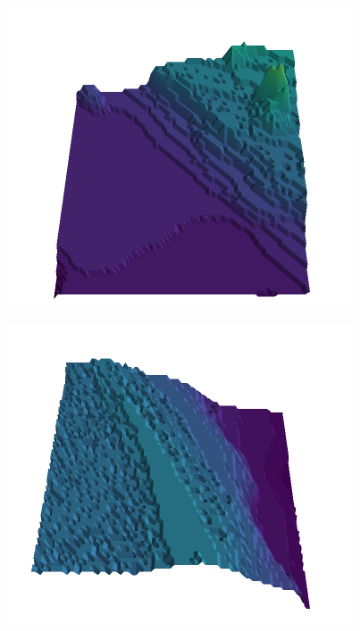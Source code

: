 \begin{figure}[H]
    \begin{subfigure}[b]{0.19\textwidth}
        \includegraphics[width=\linewidth]{../img/5/quarry/false_negative//patch-3d-majavi-colormap-0.png}
    \end{subfigure}
    \begin{subfigure}[b]{0.19\textwidth}
        \includegraphics[width=\linewidth]{../img/5/quarry/false_negative//patch-3d-majavi-colormap-1.png}
    \end{subfigure}  

\end{figure}
